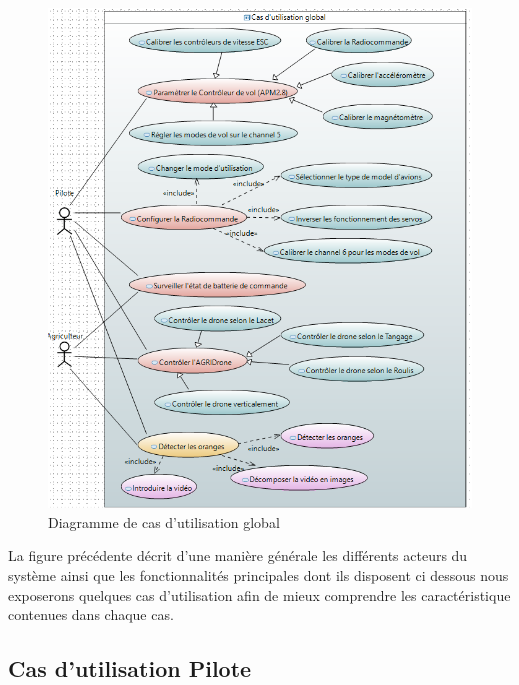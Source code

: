 	
		\begin{figure} [h]
		\begin{center}
			\centering	
		\includegraphics[width=0.9\linewidth]{Images/Diagramme de cas d'utliisation global}	
		\end{center}
		\caption{Diagramme de cas d'utilisation global}
		\end{figure}
		\newpage
		
		La figure précédente décrit d'une manière générale les différents acteurs du système ainsi que les fonctionnalités principales dont ils disposent
		ci dessous nous exposerons quelques cas d'utilisation afin de mieux comprendre les caractéristique contenues dans chaque cas.
	
		\subsection{Cas d'utilisation Pilote}
		
